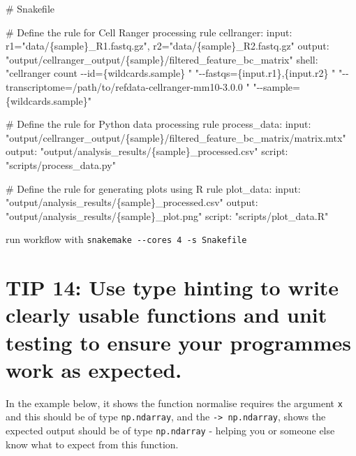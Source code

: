 \documentclass[
  letterpaper,
  DIV=11,
  numbers=noendperiod]{scrartcl}
\newenvironment{Shaded}{\begin{snugshade}}{\end{snugshade}}
\newcommand{\BuiltInTok}[1]{\textcolor[rgb]{0.00,0.23,0.31}{#1}}
\newcommand{\CommentTok}[1]{\textcolor[rgb]{0.37,0.37,0.37}{#1}}
\newcommand{\NormalTok}[1]{\textcolor[rgb]{0.00,0.23,0.31}{#1}}
\newcommand{\OperatorTok}[1]{\textcolor[rgb]{0.37,0.37,0.37}{#1}}
\newcommand{\SpecialCharTok}[1]{\textcolor[rgb]{0.37,0.37,0.37}{#1}}
\newcommand{\StringTok}[1]{\textcolor[rgb]{0.13,0.47,0.30}{#1}}
\begin{document}
\begin{Shaded}
\begin{Highlighting}[]
\CommentTok{\# Snakefile}

\CommentTok{\# Define the rule for Cell Ranger processing}
\NormalTok{rule cellranger:}
    \BuiltInTok{input}\NormalTok{:}
\NormalTok{        r1}\OperatorTok{=}\StringTok{"data/}\SpecialCharTok{\{sample\}}\StringTok{\_R1.fastq.gz"}\NormalTok{,}
\NormalTok{        r2}\OperatorTok{=}\StringTok{"data/}\SpecialCharTok{\{sample\}}\StringTok{\_R2.fastq.gz"}
\NormalTok{    output:}
        \CommentTok{"output/cellranger\_output/\{sample\}/filtered\_feature\_bc\_matrix"}
\NormalTok{    shell:}
        \CommentTok{"cellranger count {-}{-}id=\{wildcards.sample\} "}
        \CommentTok{"{-}{-}fastqs=\{input.r1\},\{input.r2\} "}
        \CommentTok{"{-}{-}transcriptome=/path/to/refdata{-}cellranger{-}mm10{-}3.0.0 "}
        \CommentTok{"{-}{-}sample=\{wildcards.sample\}"}

\CommentTok{\# Define the rule for Python data processing}
\NormalTok{rule process\_data:}
    \BuiltInTok{input}\NormalTok{:}
        \CommentTok{"output/cellranger\_output/\{sample\}/filtered\_feature\_bc\_matrix/matrix.mtx"}
\NormalTok{    output:}
        \CommentTok{"output/analysis\_results/\{sample\}\_processed.csv"}
\NormalTok{    script:}
        \CommentTok{"scripts/process\_data.py"}

\CommentTok{\# Define the rule for generating plots using R}
\NormalTok{rule plot\_data:}
    \BuiltInTok{input}\NormalTok{:}
        \CommentTok{"output/analysis\_results/\{sample\}\_processed.csv"}
\NormalTok{    output:}
        \CommentTok{"output/analysis\_results/\{sample\}\_plot.png"}
\NormalTok{    script:}
        \CommentTok{"scripts/plot\_data.R"}
\end{Highlighting}
\end{Shaded}

run workflow with \texttt{snakemake\ -\/-cores\ 4\ -s\ Snakefile}

\section{TIP 14: Use type hinting to write clearly usable functions and
unit testing to ensure your programmes work as
expected.}\label{tip-14-use-type-hinting-to-write-clearly-usable-functions-and-unit-testing-to-ensure-your-programmes-work-as-expected.}

In the example below, it shows the function normalise requires the
argument \texttt{x} and this should be of type \texttt{np.ndarray}, and
the \texttt{-\textgreater{}\ np.ndarray}, shows the expected output
should be of type \texttt{np.ndarray} - helping you or someone else know
what to expect from this function.
\end{document}
